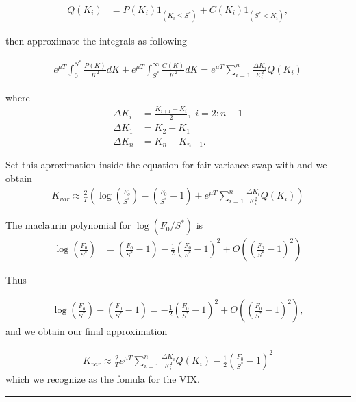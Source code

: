 \begin{align*}
Q(K_i)&=P(K_i)1_{(K_i\leq S^*)}+C(K_i)1_{(S^*<K_i)},
\end{align*} 

then approximate the integrals as following

\begin{align*}
e^{\mu T}
\int_{0}^{S^*}\frac{P(K)}{K^2}dK+e^{\mu T}\int_{S^*}^{\infty}\frac{C(K)}{K^2}dK=e^{\mu T}\sum_{i=1}^{n}\frac{\Delta K_i}{K_i^2}Q(K_i)
\end{align*}

where
\begin{align*}
\Delta K_i&=\frac{K_{i+1}-K_{i}}{2},\,\,i=2:n-1\\
\Delta K_1&=K_2-K_1\\
\Delta K_n&=K_n-K_{n-1}.
\end{align*}

Set this aproximation inside the equation for fair variance swap with and we obtain
\begin{align*}
K_{var}\approx\frac{2}{T}\left(\log\left(\frac{F_o}{S^*}\right)-\left(\frac{F_0}{S^*}-1\right)+e^{\mu T}\sum_{i=1}^{n}\frac{\Delta K_i}{K_i^2}Q(K_i)\right)
\end{align*}

The maclaurin polynomial for $\log(F_0/S^*)$ is
\begin{align*}
\log\left(\frac{F_0}{S^*}\right)&=\left(\frac{F_0}{S^*}-1\right)-\frac{1}{2}\left(\frac{F_0}{S^*}-1\right)^2+O\left(\left(\frac{F_0}{S^*}-1\right)^2\right)
\end{align*}

Thus

\begin{align*}
\log\left(\frac{F_o}{S^*}\right)-\left(\frac{F_0}{S^*}-1\right)
=-\frac{1}{2}\left(\frac{F_0}{S^*}-1\right)^2+O\left(\left(\frac{F_0}{S^*}-1\right)^2\right),
\end{align*}
and we obtain our final approximation

\begin{align*}
K_{var}\approx\frac{2}{T}e^{\mu T}\sum_{i=1}^{n}\frac{\Delta K_i}{K_i^2}Q(K_i)-\frac{1}{2}\left(\frac{F_0}{S^*}-1\right)^2
\end{align*}
which we recognize as the fomula for the VIX.

\hrule
\mbox{}
\vspace{1cm}